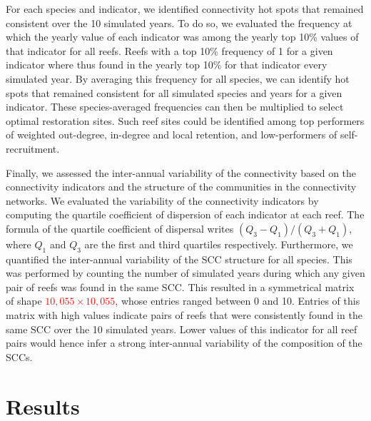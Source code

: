 \documentclass[preprint,12pt,authoryear]{elsarticle}
\newcommand{\emphc}[1]{\emph{\textcolor{red}{#1}}}
\begin{document}
For each species and indicator, we identified connectivity hot spots that remained consistent over the 10 simulated years. To do so, we evaluated the frequency at which the yearly value of each indicator was among the yearly top 10\% values of that indicator for all reefs. Reefs with a top 10\% frequency of 1 for a given indicator where thus found in the yearly top 10\% for that indicator every simulated year. By averaging this frequency for all species, we can identify hot spots that remained consistent for all simulated species and years for a given indicator. These species-averaged frequencies can then be multiplied to select optimal restoration sites. Such reef sites could be identified among top performers of weighted out-degree, in-degree and local retention, and low-performers of self-recruitment.

Finally, we assessed the inter-annual variability of the connectivity based on the connectivity indicators and the structure of the communities in the connectivity networks. We evaluated the variability of the connectivity indicators by computing the quartile coefficient of dispersion of each indicator at each reef. The formula of the quartile coefficient of dispersal writes $(Q_3-Q_1) / (Q_3+Q_1)$, where $Q_1$ and $Q_3$ are the first and third quartiles respectively. Furthermore, we quantified the inter-annual variability of the SCC structure for all species. This was performed by counting the number of simulated years during which any given pair of reefs was found in the same SCC. This resulted in a symmetrical matrix of shape \emphc{$10,055 \times 10,055$}, whose entries ranged between 0 and 10. Entries of this matrix with high values indicate pairs of reefs that were consistently found in the same SCC over the 10 simulated years. Lower values of this indicator for all reef pairs would hence infer a strong inter-annual variability of the composition of the SCCs.


\section*{Results}

%
\end{document}
